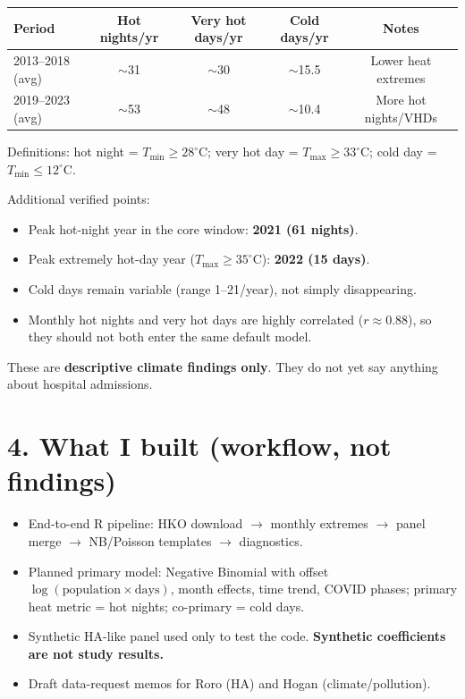 \documentclass[11pt]{article}
\begin{document}
\begin{center}
\begin{tabular}{@{}lcccc@{}}
\toprule
Period & Hot nights/yr & Very hot days/yr & Cold days/yr & Notes \\
\midrule
2013--2018 (avg) & $\sim$31 & $\sim$30 & $\sim$15.5 & Lower heat extremes \\
2019--2023 (avg) & $\sim$53 & $\sim$48 & $\sim$10.4 & More hot nights/VHDs \\
\bottomrule
\end{tabular}
\end{center}

\vspace{0.3em}
\noindent Definitions: hot night = $T_{\min}\ge 28^\circ$C; very hot day = $T_{\max}\ge 33^\circ$C; cold day = $T_{\min}\le 12^\circ$C.

\noindent Additional verified points:
\begin{itemize}
  \item Peak hot-night year in the core window: \textbf{2021 (61 nights)}.
  \item Peak extremely hot-day year ($T_{\max}\ge 35^\circ$C): \textbf{2022 (15 days)}.
  \item Cold days remain variable (range 1--21/year), not simply disappearing.
  \item Monthly hot nights and very hot days are highly correlated ($r\approx 0.88$), so they should not both enter the same default model.
\end{itemize}
These are \textbf{descriptive climate findings only}. They do not yet say anything about hospital admissions.

\section*{4. What I built (workflow, not findings)}
\begin{itemize}
  \item End-to-end R pipeline: HKO download $\rightarrow$ monthly extremes $\rightarrow$ panel merge $\rightarrow$ NB/Poisson templates $\rightarrow$ diagnostics.
  \item Planned primary model: Negative Binomial with offset $\log(\mathrm{population}\times\mathrm{days})$, month effects, time trend, COVID phases; primary heat metric = hot nights; co-primary = cold days.
  \item Synthetic HA-like panel used only to test the code. \textbf{Synthetic coefficients are not study results.}
  \item Draft data-request memos for Roro (HA) and Hogan (climate/pollution).
\end{itemize}
\end{document}
